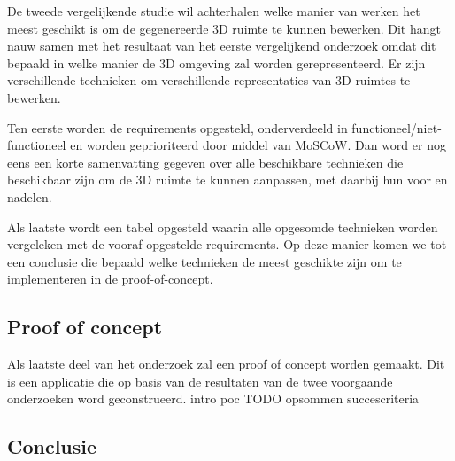 De tweede vergelijkende studie wil achterhalen welke manier van werken het meest geschikt is om de gegenereerde 3D ruimte te kunnen bewerken. Dit hangt nauw samen met het resultaat van het eerste vergelijkend onderzoek omdat dit bepaald in welke manier de 3D omgeving zal worden gerepresenteerd. Er zijn verschillende technieken om verschillende representaties van 3D ruimtes te bewerken.

Ten eerste worden de requirements opgesteld, onderverdeeld in functioneel/niet-functioneel en worden geprioriteerd door middel van MoSCoW.
Dan word er nog eens een korte samenvatting gegeven over alle beschikbare technieken die beschikbaar zijn om de 3D ruimte te kunnen aanpassen, met daarbij hun voor en nadelen.

Als laatste wordt een tabel opgesteld waarin alle opgesomde technieken worden vergeleken met de vooraf opgestelde requirements. Op deze manier komen we tot een conclusie die bepaald welke technieken de meest geschikte zijn om te implementeren in de proof-of-concept.


\subsection{Proof of concept}

Als laatste deel van het onderzoek zal een proof of concept worden gemaakt. Dit is een applicatie die op basis van de resultaten van de twee voorgaande onderzoeken word geconstrueerd.
intro poc TODO
opsommen succescriteria

\subsection{Conclusie}